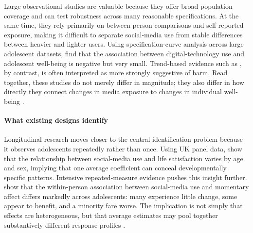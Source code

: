 \documentclass[11pt,oneside,a4paper]{book}
\begin{document}
Large observational studies are valuable because they offer broad population coverage and can test robustness across many reasonable specifications. At the same time, they rely primarily on between-person comparisons and self-reported exposure, making it difficult to separate social-media use from stable differences between heavier and lighter users. Using specification-curve analysis across large adolescent datasets, \citet{orbenprzybylski2019association} find that the association between digital-technology use and adolescent well-being is negative but very small. Trend-based evidence such as \citet{twenge2018newmedia}, by contrast, is often interpreted as more strongly suggestive of harm. Read together, these studies do not merely differ in magnitude; they also differ in how directly they connect changes in media exposure to changes in individual well-being \citep{orbenprzybylski2019association,twenge2018newmedia}. \\
\\
\textbf{What existing designs identify}\\
\\
Longitudinal research moves closer to the central identification problem because it observes adolescents repeatedly rather than once. Using UK panel data, \citet{orben2022windows} show that the relationship between social-media use and life satisfaction varies by age and sex, implying that one average coefficient can conceal developmentally specific patterns. Intensive repeated-measure evidence pushes this insight further. \citet{beyens2020effect} show that the within-person association between social-media use and momentary affect differs markedly across adolescents: many experience little change, some appear to benefit, and a minority fare worse. The implication is not simply that effects are heterogeneous, but that average estimates may pool together substantively different response profiles \citep{orben2022windows,beyens2020effect}. 
\end{document}
